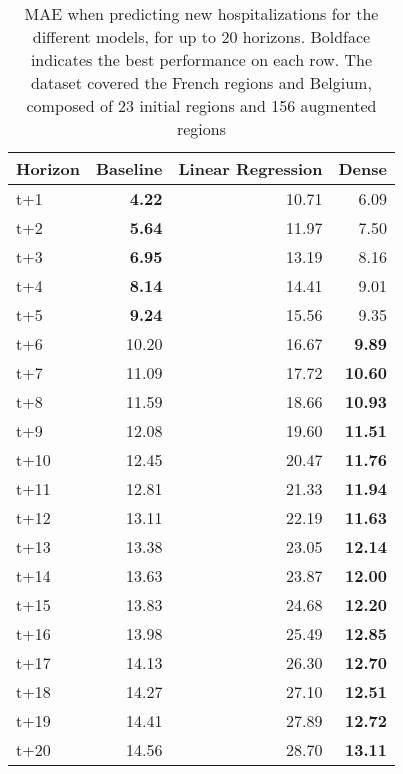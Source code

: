 \begin{table}[H]
\centering
\caption{MAE when predicting new hospitalizations for the different models, for up to 20 horizons. Boldface indicates the best performance on each row. The dataset covered the French regions and Belgium, composed of 23 initial regions and 156 augmented regions }
\label{tab:MAE_comparison}
\begin{tabular}{lrrr}
\toprule
Horizon &  Baseline &  Linear Regression &  Dense \\
\midrule
t+1  & \textbf{4.22}  & 10.71  & 6.09  \\
t+2  & \textbf{5.64}  & 11.97  & 7.50  \\
t+3  & \textbf{6.95}  & 13.19  & 8.16  \\
t+4  & \textbf{8.14}  & 14.41  & 9.01  \\
t+5  & \textbf{9.24}  & 15.56  & 9.35  \\
t+6  & 10.20  & 16.67  & \textbf{9.89}  \\
t+7  & 11.09  & 17.72  & \textbf{10.60}  \\
t+8  & 11.59  & 18.66  & \textbf{10.93}  \\
t+9  & 12.08  & 19.60  & \textbf{11.51}  \\
t+10  & 12.45  & 20.47  & \textbf{11.76}  \\
t+11  & 12.81  & 21.33  & \textbf{11.94}  \\
t+12  & 13.11  & 22.19  & \textbf{11.63}  \\
t+13  & 13.38  & 23.05  & \textbf{12.14}  \\
t+14  & 13.63  & 23.87  & \textbf{12.00}  \\
t+15  & 13.83  & 24.68  & \textbf{12.20}  \\
t+16  & 13.98  & 25.49  & \textbf{12.85}  \\
t+17  & 14.13  & 26.30  & \textbf{12.70}  \\
t+18  & 14.27  & 27.10  & \textbf{12.51}  \\
t+19  & 14.41  & 27.89  & \textbf{12.72}  \\
t+20  & 14.56  & 28.70  & \textbf{13.11}  \\

\bottomrule
\end{tabular}
\end{table}
